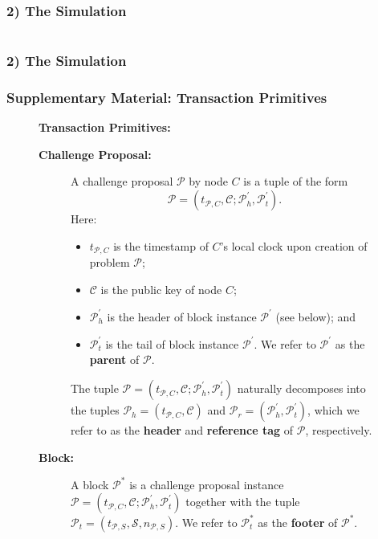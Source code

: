 \documentclass{beamer}
\begin{document}
\begin{frame}
	\frametitle{2) The Simulation}

	\begin{columns}
		\begin{column}{0.3\textwidth}
			\centering
			
		\end{column}

		\begin{column}{0.7\textwidth}
			\centering

		\end{column}
	\end{columns}	
\end{frame}

\begin{frame}
	\frametitle{2) The Simulation}

	
\end{frame}

\begin{frame}
	\frametitle{Supplementary Material: Transaction Primitives}
	\begin{figure}
		\scriptsize
		\centering
		\textbf{Transaction Primitives:} \\
		\vspace{5mm}
		\begin{description}
			\item[\textbf{Challenge Proposal:}] A challenge proposal $\mathcal{P}$ by
				node $C$ is a tuple of the form
				$$\mathcal{P}=(t_{\mathcal{P},C},\mathcal{C};\mathcal{P}^\prime_h,\mathcal{P}^\prime_t).$$
				Here:
				\begin{itemize}
					\item $t_{\mathcal{P},C}$ is the timestamp of $C$'s local clock upon
					creation of problem $\mathcal{P}$;
					\item $\mathcal{C}$ is the public key of node $C$;
					\item $\mathcal{P}^\prime_h$ is the header of block instance
					$\mathcal{P}^\prime$ (see below); and
					\item $\mathcal{P}^\prime_t$ is the tail of block instance
					$\mathcal{P}^\prime$. We refer to $\mathcal{P}^\prime$ as
					the \textbf{parent} of $\mathcal{P}$.
				\end{itemize}
				The tuple
				$\mathcal{P}=(t_{\mathcal{P},C},\mathcal{C};\mathcal{P}^\prime_h,\mathcal{P}^\prime_t)$
				naturally decomposes into the tuples
				$\mathcal{P}_h=(t_{\mathcal{P},C},\mathcal{C})$ and
				$\mathcal{P}_r=(\mathcal{P}^\prime_h,\mathcal{P}^\prime_t)$, which we
				refer to as the \textbf{header} and \textbf{reference tag} of $\mathcal{P}$,
				respectively.
			\item[\textbf{Block:}] A block $\mathcal{P}^*$ is a challenge proposal instance
				$\mathcal{P}=(t_{\mathcal{P},C},\mathcal{C};\mathcal{P}^\prime_h,\mathcal{P}^\prime_t)$
				together with the tuple $\mathcal{P}_t=(t_{\mathcal{P},S},\mathcal{S},n_{\mathcal{P},S})$.
				We refer to $\mathcal{P}^*_t$ as the \textbf{footer} of $\mathcal{P}^*$.
		\end{description}
	\end{figure}
\end{frame}
\end{document}
